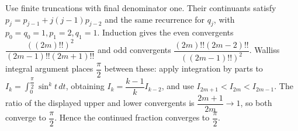 Use finite truncations with final denominator one. Their continuants satisfy $p_j=p_{j-1}+j(j-1)p_{j-2}$ and the same recurrence for $q_j$, with $p_0=q_0=1,p_1=2,q_1=1$. Induction gives the even convergents $\dfrac{((2m)!!)^2}{(2m-1)!!(2m+1)!!}$ and odd convergents $\dfrac{(2m)!!(2m-2)!!}{((2m-1)!!)^2}$. Wallis\textquotesingle s integral argument places $\dfrac{\pi}{2}$ between these: apply integration by parts to $I_k = \int_0^{\dfrac{\pi}{2}} \sin^k t \, d t$, obtaining $I_k=\dfrac{k-1}{k}I_{k-2}$, and use $I_{2m+1}<I_{2m}<I_{2m-1}$. The ratio of the displayed upper and lower convergents is $\dfrac{2m+1}{2m}\to1$, so both converge to $\dfrac{\pi}{2}$. Hence the continued fraction converges to $\boxed{\dfrac{\pi}{2}}$.
